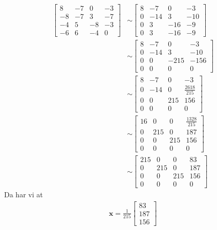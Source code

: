 \documentclass[11pt, a4paper, norsk]{NTNUoving}
\begin{document}
\begin{oppgave}
    \begin{punkt}
    \begin{align*}
        \begin{bmatrix}
            8 & -7 & 0 & -3\\
            -8 & -7 & 3 & -7\\
            -4 & 5 & -8 & -3\\
            -6 & 6 & -4 & 0
        \end{bmatrix}
        &\sim
        \begin{bmatrix}
            8 & -7 & 0 & -3\\
            0 & -14 & 3 & -10\\
            0 & 3 & -16 & -9\\
            0 & 3 & -16 & -9
        \end{bmatrix}
        \\&\sim
        \begin{bmatrix}
            8 & -7 & 0 & -3\\
            0 & -14 & 3 & -10\\
            0 & 0 & -215 & -156\\
            0 & 0 & 0 & 0
        \end{bmatrix}
        \\&\sim
        \begin{bmatrix}
            8 & -7 & 0 & -3\\
            0 & -14 & 0 & \frac{2618}{215}\\
            0 & 0 & 215 & 156\\
            0 & 0 & 0 & 0
        \end{bmatrix}
        \\&\sim
        \begin{bmatrix}
            16 & 0 & 0 & \frac{1328}{215}\\
            0 & 215 & 0 & 187\\
            0 & 0 & 215 & 156\\
            0 & 0 & 0 & 0
        \end{bmatrix}
        \\&\sim 
        \begin{bmatrix}
            215 & 0 & 0 & 83\\
            0 & 215 & 0 & 187\\
            0 & 0 & 215 & 156\\
            0 & 0 & 0 & 0
        \end{bmatrix}
    \end{align*}
    Da har vi at 
    \begin{align*}
        \textbf{x} =\frac{1}{215}
        \begin{bmatrix}
            83\\
            187\\
            156
        \end{bmatrix}
    \end{align*}
    \end{punkt}
\end{oppgave}
\end{document}
